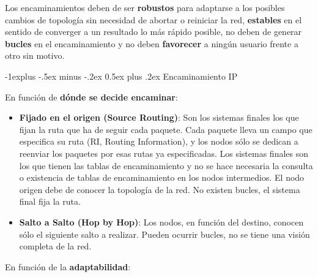\documentclass[10pt,portrait, twocolumn]{article}
\makeatletter
\renewcommand{\subsection}{\@startsection{subsection}{2}{0mm}%
                                {-1explus -.5ex minus -.2ex}%
                                {0.5ex plus .2ex}%
                                {\normalfont\normalsize\bfseries}}
\makeatother
\begin{document}
Los encaminamientos deben de ser \textbf{robustos} para adaptarse a los posibles cambios de topología sin necesidad de abortar o reiniciar la red, \textbf{estables} en el sentido de converger a un resultado lo más rápido posible, no deben de generar \textbf{bucles} en el encaminamiento y no deben \textbf{favorecer} a ningún usuario frente a otro sin motivo.

\subsection{Encaminamiento IP}

En función de \textbf{dónde se decide encaminar}:

	\begin{itemize}
		\item \textbf{Fijado en el origen (Source Routing)}: Son los sistemas finales los que fijan la ruta que ha de seguir cada paquete. Cada paquete lleva un campo que especifica su ruta (RI, Routing Information), y los nodos sólo se dedican a reenviar los paquetes por esas rutas ya especificadas. Los sistemas finales son los que tienen las tablas de encaminamiento y no se hace necesaria la consulta o existencia de tablas de encaminamiento en los nodos intermedios. El nodo origen debe de conocer la topología de la red. No existen bucles, el sistema final fija la ruta.
		\item \textbf{Salto a Salto (Hop by Hop)}: Los nodos, en función del destino, conocen sólo el siguiente salto a realizar. Pueden ocurrir bucles, no se tiene una visión completa de la red.
	\end{itemize}
	
En función de la \textbf{adaptabilidad}:
\end{document}

